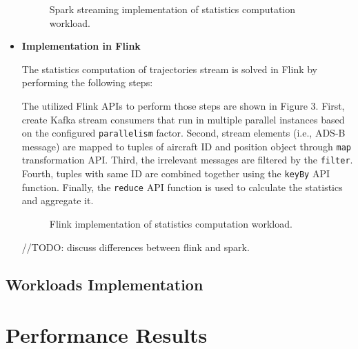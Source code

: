 \documentclass[]{article}
\begin{document}
\begin{itemize}
\begin{figure}[h]
 
  \centering
  
     \caption{Spark streaming implementation of statistics computation workload.}
\end{figure} 

\item {\bf{Implementation in Flink }}

The statistics computation of trajectories stream is solved in Flink by performing the following steps: 

\par The utilized Flink APIs to perform those steps are shown in Figure 3. First, create Kafka stream consumers that run in multiple parallel instances based on the configured \texttt{parallelism} factor. Second,  stream elements (i.e., ADS-B message) are mapped  to tuples of aircraft ID and  position object through \texttt{map} transformation API. Third, the irrelevant messages are filtered by the \texttt{filter}. Fourth, tuples with same ID are combined together using the \texttt{keyBy} API function. Finally, the \texttt{reduce} API function is used to calculate the statistics and aggregate it.

\begin{figure}[h]
 
  \centering
  
     \caption{Flink implementation of statistics computation workload.}
\end{figure}


//TODO: discuss differences between flink and spark.


\end{itemize}
\subsection{Workloads Implementation}
\section{Performance Results}
\end{document}
